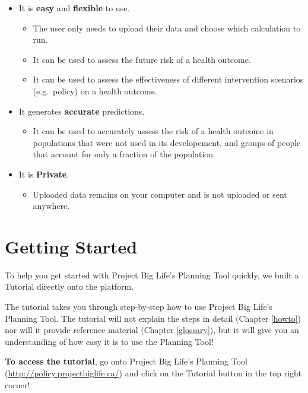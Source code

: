 \documentclass[]{book}
\providecommand{\tightlist}{%
  \setlength{\itemsep}{0pt}\setlength{\parskip}{0pt}}
\begin{document}
\begin{itemize}
\item
  It is \textbf{easy} and \textbf{flexible} to use.

  \begin{itemize}
  \tightlist
  \item
    The user only needs to upload their data and choose which
    calculation to run.
  \item
    It can be used to assess the future risk of a health outcome.
  \item
    It can be used to assess the effectiveness of different intervention
    scenarios (e.g.~policy) on a health outcome.
  \end{itemize}
\item
  It generates \textbf{accurate} predictions.

  \begin{itemize}
  \tightlist
  \item
    It can be used to accurately assess the risk of a health outcome in
    populations that were not used in its developement, and groups of
    people that account for only a fraction of the population.
  \end{itemize}
\item
  It is \textbf{Private}.

  \begin{itemize}
  \tightlist
  \item
    Uploaded data remains on your computer and is not uploaded or sent
    anywhere.
  \end{itemize}
\end{itemize}

\chapter{Getting Started}\label{getting-started}

To help you get started with Project Big Life's Planning Tool quickly,
we built a Tutorial directly onto the platform.

The tutorial takes you through step-by-step how to use Project Big
Life's Planning Tool. The tutorial will not explain the steps in detail
(Chapter \ref{howto}) nor will it provide reference material (Chapter
\ref{glossary}), but it will give you an understanding of how easy it is
to use the Planning Tool!

\textbf{To access the tutorial}, go onto Project Big Life's Planning
Tool (\url{http://policy.projectbiglife.ca/}) and click on the Tutorial
button in the top right corner!
\end{document}
